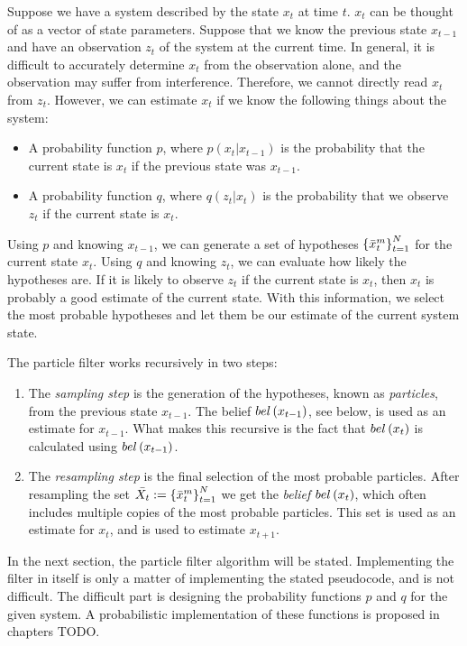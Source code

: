 Suppose we have a system described by the state $x_t$ at time $t$. $x_t$ can be thought of as a vector of state parameters. Suppose that we know the previous state $x_{t-1}$ and have an observation $z_t$ of the system at the current time. In general, it is difficult to accurately determine $x_t$ from the observation alone, and the observation may suffer from interference. Therefore, we cannot directly read $x_t$ from $z_t$. However, we can estimate $x_t$ if we know the following things about the system:

\begin{itemize}
\item A probability function $p$, where $p\left(x_t | x_{t-1}\right)$ is the probability that the current state is $x_t$ if the previous state was $x_{t-1}$.
\item A probability function $q$, where $q\left(z_t | x_t\right)$ is the probability that we observe $z_t$ if the current state is $x_t$.
\end{itemize}

Using $p$ and knowing $x_{t-1}$, we can generate a set of hypotheses $\left\{\bar{x}_{t}^{m}\right\}_{t=1}^{N}$ for the current state $x_t$. Using $q$ and knowing $z_t$, we can evaluate how likely the hypotheses are. If it is likely to observe $z_t$ if the current state is $x_t$, then $x_t$ is probably a good estimate of the current state. With this information, we select the most probable hypotheses and let them be our estimate of the current system state.

The particle filter works recursively in two steps:

\begin{enumerate}
\item The \emph{sampling step} is the generation of the hypotheses, known as \emph{particles}, from the previous state $x_{t-1}$. The belief $bel\left(x_{t-1}\right)$, see below, is used as an estimate for $x_{t-1}$. What makes this recursive is the fact that $bel\left(x_t\right)$ is calculated using $bel\left(x_{t-1}\right)$.

\item The \emph{resampling step} is the final selection of the most probable particles. After resampling the set $\bar{X_t} := \left\{\bar{x}_{t}^{m}\right\}_{t=1}^{N}$ we get the \emph{belief} $bel\left(x_t\right)$, which often includes multiple copies of the most probable particles. This set is used as an estimate for $x_t$, and is used to estimate $x_{t+1}$.
\end{enumerate}

In the next section, the particle filter algorithm will be stated. Implementing the filter in itself is only a matter of implementing the stated pseudocode, and is not difficult. The difficult part is designing the probability functions $p$ and $q$ for the given system. A probabilistic implementation of these functions is proposed in chapters TODO.


